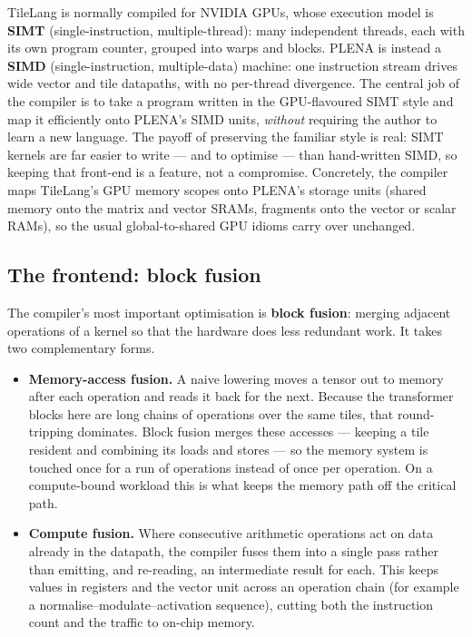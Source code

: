 \documentclass[11pt]{report}
\begin{document}
TileLang is normally compiled for NVIDIA GPUs, whose execution model is
\textbf{SIMT} (single-instruction, multiple-thread): many independent
threads, each with its own program counter, grouped into warps and blocks.
PLENA is instead a \textbf{SIMD} (single-instruction, multiple-data)
machine: one instruction stream drives wide vector and tile datapaths,
with no per-thread divergence. The central job of the compiler is to take a
program written in the GPU-flavoured SIMT style and map it efficiently onto
PLENA's SIMD units, \emph{without} requiring the author to learn a new
language. The payoff of preserving the familiar style is real: SIMT kernels
are far easier to write --- and to optimise --- than hand-written SIMD, so
keeping that front-end is a feature, not a compromise. Concretely, the
compiler maps TileLang's GPU memory scopes onto PLENA's storage units
(shared memory onto the matrix and vector SRAMs, fragments onto the vector
or scalar RAMs), so the usual global-to-shared GPU idioms carry over
unchanged.

\subsection{The frontend: block fusion}

The compiler's most important optimisation is \textbf{block fusion}:
merging adjacent operations of a kernel so that the hardware does less
redundant work. It takes two complementary forms.

\begin{itemize}
\item \textbf{Memory-access fusion.} A naive lowering moves a tensor out to
memory after each operation and reads it back for the next. Because the
transformer blocks here are long chains of operations over the same tiles,
that round-tripping dominates. Block fusion merges these accesses ---
keeping a tile resident and combining its loads and stores --- so the
memory system is touched once for a run of operations instead of once per
operation. On a compute-bound workload this is what keeps the memory path
off the critical path.
\item \textbf{Compute fusion.} Where consecutive arithmetic operations act
on data already in the datapath, the compiler fuses them into a single
pass rather than emitting, and re-reading, an intermediate result for each.
This keeps values in registers and the vector unit across an operation
chain (for example a normalise--modulate--activation sequence), cutting
both the instruction count and the traffic to on-chip memory.
\end{itemize}
\end{document}
